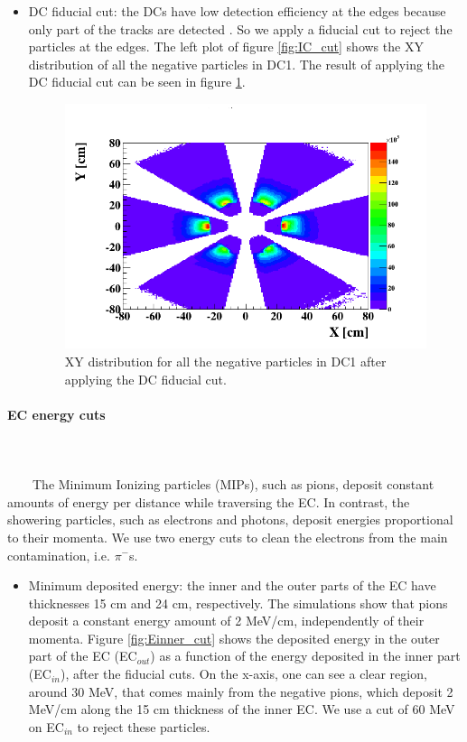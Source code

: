 \begin{itemize}
\begin{itemize}
\item DC fiducial cut: the DCs have low detection efficiency at the edges because only part of the tracks are detected \cite{DCref}. So we apply a fiducial cut to reject the particles at the edges. The left plot of figure \ref{fig:IC_cut} shows the XY distribution of all the negative particles in DC1. The result of applying the DC fiducial cut can be seen in figure \ref{fig:DC_cut}.  
\begin{figure}[tbp]
\centering
\includegraphics[scale=0.35]{fig_analysis/DC_el_2.png}
\caption{ XY distribution for all the negative particles in DC1 after applying the DC fiducial cut.} 
\label{fig:DC_cut}
\end{figure}

\end{itemize}

\paragraph{EC energy cuts}
~\\
~\\
~~~~The Minimum Ionizing particles (MIPs), such as pions, deposit constant 
amounts of energy per distance while traversing the EC.  In contrast, the 
showering particles, such as electrons and photons, deposit energies 
proportional to their momenta. We use two energy cuts to clean the electrons 
from the main contamination, i.e.  $\pi^{-}$s.
\begin{itemize}
\item Minimum deposited energy:
   the inner and the outer parts of the EC have thicknesses 15 cm and 24 cm, 
   respectively. The simulations show that pions deposit a constant energy 
   amount of 2 MeV/cm, independently of their momenta. Figure 
   \ref{fig:Einner_cut} shows the deposited energy in the outer part of the EC 
   (EC$_{out}$) as a function of the energy deposited in the inner part 
   (EC$_{in}$), after the fiducial cuts. On the x-axis, one can see a clear 
   region, around 30 MeV, that comes mainly from the negative pions, which 
   deposit 2 MeV/cm along the 15 cm thickness of the inner EC. We use a cut of 
   60 MeV on EC$_{in}$ to reject these particles. 
   

\end{itemize}
\end{itemize}
